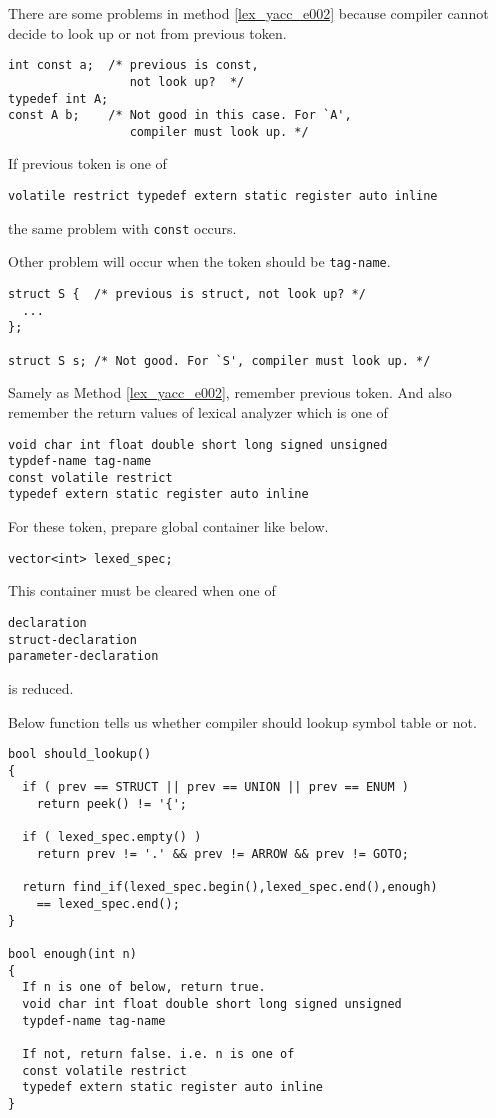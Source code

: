 There are some problems in method \ref{lex_yacc_e002} because
compiler cannot decide to look up or not from
previous token.

\begin{verbatim}
int const a;  /* previous is const,
                 not look up?  */
typedef int A;
const A b;    /* Not good in this case. For `A',
                 compiler must look up. */
\end{verbatim}
If previous token is one of
\begin{verbatim}
volatile restrict typedef extern static register auto inline
\end{verbatim}
the same problem with {\tt{const}} occurs.

Other problem will occur when the token
should be {\tt{tag-name}}.

\begin{verbatim}
struct S {  /* previous is struct, not look up? */
  ...
};

struct S s; /* Not good. For `S', compiler must look up. */
\end{verbatim}


\begin{Method}
\label{lex_yacc_e005}
Samely as Method \ref{lex_yacc_e002}, remember previous token.
And also remember the return values of lexical analyzer
which is one of
\begin{verbatim}
void char int float double short long signed unsigned
typdef-name tag-name
const volatile restrict
typedef extern static register auto inline
\end{verbatim}
For these token, prepare global container like below.
\begin{verbatim}
vector<int> lexed_spec;
\end{verbatim}
This container must be cleared when one of
\begin{verbatim}
declaration
struct-declaration
parameter-declaration
\end{verbatim}
is reduced.

Below function tells us whether compiler should lookup
symbol table or not.
\begin{verbatim}
bool should_lookup()
{
  if ( prev == STRUCT || prev == UNION || prev == ENUM )
    return peek() != '{';

  if ( lexed_spec.empty() )
    return prev != '.' && prev != ARROW && prev != GOTO;

  return find_if(lexed_spec.begin(),lexed_spec.end(),enough)
    == lexed_spec.end();
}

bool enough(int n)
{
  If n is one of below, return true.
  void char int float double short long signed unsigned
  typdef-name tag-name

  If not, return false. i.e. n is one of 
  const volatile restrict
  typedef extern static register auto inline
}
\end{verbatim}
\end{Method}


